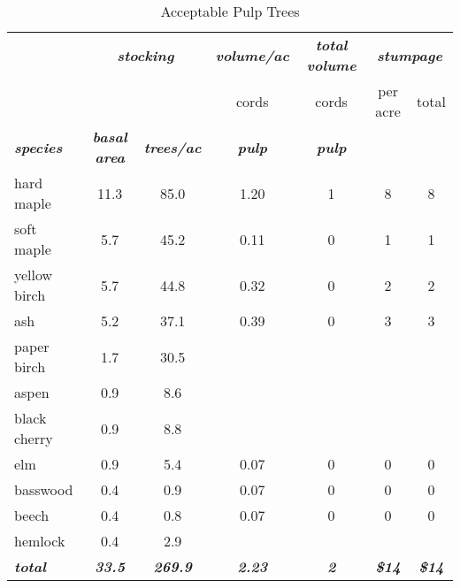 \documentclass[landscape]{article}
\begin{document}
\begin{table}[H]

\caption{\label{tab:unnamed-chunk-49}Acceptable Pulp Trees}
\fontsize{10}{12}\selectfont
\begin{tabular}[t]{lcccccc}
\toprule
\multicolumn{1}{c}{\em{\textbf{ }}} & \multicolumn{2}{c}{\em{\textbf{stocking}}} & \multicolumn{1}{c}{\em{\textbf{volume/ac }}} & \multicolumn{1}{c}{\em{\textbf{total volume}}} & \multicolumn{2}{c}{\em{\textbf{stumpage}}} \\
\cmidrule(l{3pt}r{3pt}){2-3} \cmidrule(l{3pt}r{3pt}){4-4} \cmidrule(l{3pt}r{3pt}){5-5} \cmidrule(l{3pt}r{3pt}){6-7}
\multicolumn{3}{c}{ } & \multicolumn{1}{c}{cords} & \multicolumn{1}{c}{cords} & \multicolumn{1}{c}{per acre} & \multicolumn{1}{c}{total} \\
\cmidrule(l{3pt}r{3pt}){4-4} \cmidrule(l{3pt}r{3pt}){5-5} \cmidrule(l{3pt}r{3pt}){6-6} \cmidrule(l{3pt}r{3pt}){7-7}
\rowcolor[HTML]{DCDCDC}  \em{\textbf{species}} & \em{\textbf{basal area}} & \em{\textbf{trees/ac}} & \em{\textbf{pulp}} & \em{\textbf{pulp}} & \em{\textbf{ }} & \em{\textbf{ }}\\
\midrule
\rowcolor{gray!6}  hard maple & 11.3 & 85.0 & 1.20 & 1 & 8 & 8\\
 
soft maple & 5.7 & 45.2 & 0.11 & 0 & 1 & 1\\
 
\rowcolor{gray!6}  yellow birch & 5.7 & 44.8 & 0.32 & 0 & 2 & 2\\
 
ash & 5.2 & 37.1 & 0.39 & 0 & 3 & 3\\
 
\rowcolor{gray!6}  paper birch & 1.7 & 30.5 &  &  &  & \\
 
aspen & 0.9 & 8.6 &  &  &  & \\
 
\rowcolor{gray!6}  black cherry & 0.9 & 8.8 &  &  &  & \\
 
elm & 0.9 & 5.4 & 0.07 & 0 & 0 & 0\\
 
\rowcolor{gray!6}  basswood & 0.4 & 0.9 & 0.07 & 0 & 0 & 0\\
 
beech & 0.4 & 0.8 & 0.07 & 0 & 0 & 0\\
 
\rowcolor{gray!6}  hemlock & 0.4 & 2.9 &  &  &  & \\
 
\rowcolor[HTML]{DCDCDC}  \em{\textbf{total}} & \em{\textbf{33.5}} & \em{\textbf{269.9}} & \em{\textbf{2.23}} & \em{\textbf{2}} & \em{\textbf{\$14}} & \em{\textbf{\$14}}\\
\bottomrule
\end{tabular}
\end{table}
\end{document}
